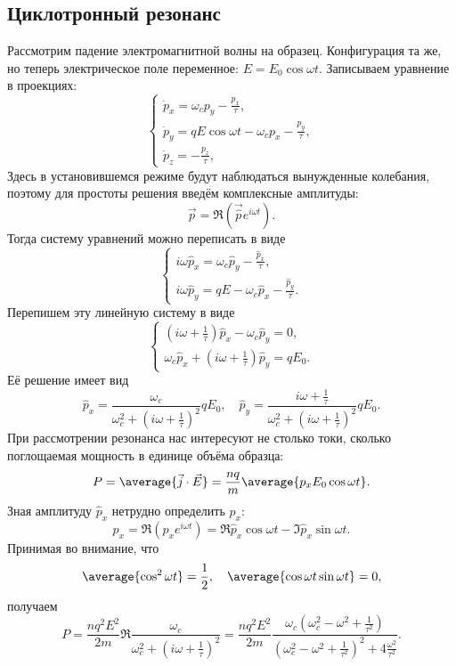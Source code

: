 \subsection{Циклотронный резонанс}
    Рассмотрим падение электромагнитной волны на образец. Конфигурация та же, но
    теперь электрическое поле переменное: \( E = E_0\cos\omega t \). Записываем
    уравнение в проекциях:
    \[
        \left\{
            \begin{array}{l}
                \dot{p}_x = \omega_c p_y - \frac{p_x}{\tau}, \\
                \dot{p}_y = qE\cos\omega t - \omega_c p_x - \frac{p_y}{\tau}, \\
                \dot{p}_z = -\frac{p_z}{\tau},
            \end{array}
        \right.
    \]
    Здесь в установившемся режиме будут наблюдаться вынужденные колебания,
    поэтому для простоты решения введём комплексные амплитуды:
    \[
        \vec{p} = \Re\left(\vec{\hat{p}}e^{i\omega t}\right).
    \]
    Тогда систему уравнений можно переписать в виде
    \[
        \left\{
            \begin{array}{l}
                i\omega\hat{p}_x = \omega_c\hat{p}_y - \frac{\hat{p}_x}{\tau},\\
                i\omega\hat{p}_y = qE - \omega_c\hat{p}_x -
                    \frac{\hat{p}_y}{\tau}.
            \end{array}
        \right.
    \]
    Перепишем эту линейную систему в виде
    \[
         \left\{
            \begin{array}{l}
                (i\omega + \frac{1}{\tau})\hat{p}_x - \omega_c\hat{p}_y = 0,\\
                \omega_c\hat{p}_x + (i\omega + \frac{1}{\tau})\hat{p}_y = qE_0.
            \end{array}
        \right.
    \]
    Её решение имеет вид
    \[
        \hat{p}_x = \frac{\omega_c}{\omega_c^2 + (i\omega + \frac{1}{\tau})^2}
            qE_0, \quad
        \hat{p}_y = \frac{i\omega + \frac{1}{\tau}}
            {\omega_c^2 + (i\omega + \frac{1}{\tau})^2} qE_0.
    \]
    При рассмотрении резонанса нас интересуют не столько токи, сколько
    поглощаемая мощность в единице объёма образца:
    \[
        P = \average{\vec{j}\cdot\vec{E}} =
        \frac{nq}{m}\average{p_xE_0\cos\omega t}.
    \]
    Зная амплитуду \( \hat{p}_x \) нетрудно определить \( p_x \):
    \[
        p_x = \Re (\hat{p}_xe^{i\omega t}) = \Re\hat{p}_x \cos\omega t -
            \Im\hat{p}_x \sin\omega t.
    \]
    Принимая во внимание, что
    \[
        \average{\cos^2\omega t} = \frac{1}{2}, \quad
        \average{\cos\omega t \sin\omega t} = 0,
    \]
    получаем
    \[
        P = \frac{nq^2E^2}{2m}
        \Re\frac{\omega_c}{\omega_c^2 + (i\omega + \frac{1}{\tau})^2} =
        \frac{nq^2E^2}{2m}
        \frac{\omega_c\left(\omega_c^2 - \omega^2 + \frac{1}{\tau^2}\right)}
        {\left(\omega_c^2 - \omega^2 + \frac{1}{\tau^2}\right)^2 +
        4\frac{\omega^2}{\tau^2}}.
    \]
